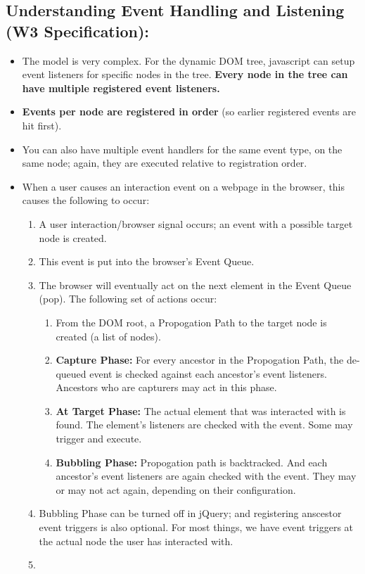 \documentclass[8pt,a4paper]{extarticle}
\begin{document}
\subsection*{Understanding Event Handling and Listening (W3 Specification):}

\begin{itemize}
\item The model is very complex. For the dynamic DOM tree, javascript can 
setup event listeners for specific nodes in the tree. \textbf{Every node in the tree can have multiple registered event listeners.} 

\item \textbf{Events per node are registered in order} (so earlier registered events are hit first).
\item You can also have multiple event handlers for the same event type, on the same node; again, they are executed relative to registration order.
\item When a user causes an interaction event on a webpage in the browser, this
causes the following to occur:

\begin{enumerate}
\item A user interaction/browser signal occurs; an event with a possible target node is created.
\item This event is put into the browser's Event Queue.
\item The browser will eventually act on the next element in the Event Queue (pop). The following set of actions occur:
\begin{enumerate}
\item From the DOM root, a Propogation Path to the target node is created (a list of nodes). 
\item \textbf{Capture Phase:} For every ancestor in the Propogation Path, the de-queued event is checked against each ancestor's event listeners. Ancestors who are capturers may  act in this phase.
\item \textbf{At Target Phase:} The actual element that was interacted with is found. The element's listeners are checked with the event. Some may trigger and execute.
\item  \textbf{Bubbling Phase:} Propogation path is backtracked. And each ancestor's event listeners are again checked with the event. They may or may not act again, depending on their configuration.
\end{enumerate}
\item Bubbling Phase can be turned off in jQuery; and registering anscestor event triggers is also optional. For most things, we have event triggers at the actual node the user has interacted with.
\item


\end{enumerate}
\end{itemize}
\end{document}

